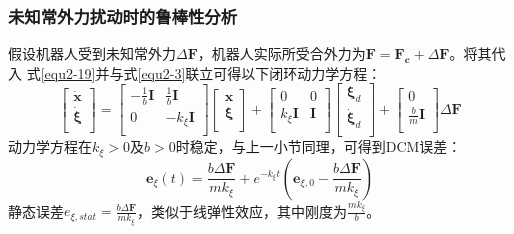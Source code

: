         \subsubsection{未知常外力扰动时的鲁棒性分析}
            假设机器人受到未知常外力$\varDelta \boldsymbol{F}$，机器人实际所受合外力为$\boldsymbol{F}=\boldsymbol{F_c}+\varDelta \boldsymbol{F}$。将其代入
            式\eqref{equ2-19}并与式\eqref{equ2-3}联立可得以下闭环动力学方程：
            \begin{equation}
                \left[ \begin{array}{c}
                    \boldsymbol{\dot{x}}\\
                    \boldsymbol{\dot{\xi}}\\
                \end{array} \right] =\left[ \begin{matrix}
                    -\frac{1}{b}\boldsymbol{I}&		\frac{1}{b}\boldsymbol{I}\\
                    0&		-k_{\xi}\boldsymbol{I}\\
                \end{matrix} \right] \left[ \begin{array}{c}
                    \boldsymbol{x}\\
                    \boldsymbol{\xi }\\
                \end{array} \right] +\left[ \begin{matrix}
                    0&		0\\
                    k_{\xi}\boldsymbol{I}&		\boldsymbol{I}\\
                \end{matrix} \right] \left[ \begin{array}{c}
                    \boldsymbol{\xi }_d\\
                    \boldsymbol{\dot{\xi}}_d\\
                \end{array} \right] +\left[ \begin{array}{c}
                    0\\
                    \frac{b}{m}\boldsymbol{I}\\
                \end{array} \right] \varDelta \boldsymbol{F} 
                \label{equ2-25}
            \end{equation}
            动力学方程在$k_{\xi}>0$及$b>0$时稳定，与上一小节同理，可得到DCM误差：
            \begin{equation}
                \boldsymbol{e}_{\xi}\left( t \right) =\frac{b\varDelta \boldsymbol{F}}{mk_{\xi}}+e^{-k_{\xi}t}\left( \boldsymbol{e}_{\xi ,0}-\frac{b\varDelta \boldsymbol{F}}{mk_{\xi}} \right) 
                \label{equ2-26}
            \end{equation}
            静态误差$e_{\xi,stat}=\frac{b\varDelta \boldsymbol{F}}{mk_{\xi}}$，类似于线弹性效应，其中刚度为$\frac{mk_{\xi}}{b}$。
